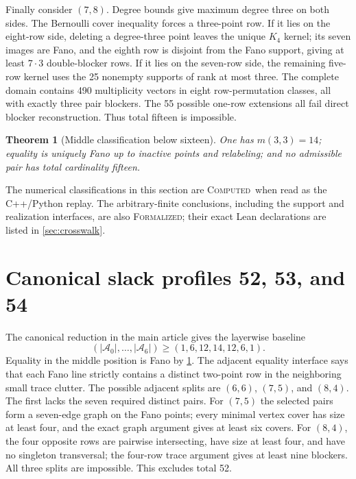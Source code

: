 \documentclass[11pt,a4paper]{article}
\newtheorem{theorem}{Theorem}[section]
\theoremstyle{definition}
\newcommand{\computed}{\textsc{Computed}}
\newcommand{\formalized}{\textsc{Formalized}}
\begin{document}
Finally consider $(7,8)$.  Degree bounds give maximum degree three on both
sides.  The Bernoulli cover inequality forces a three-point row.  If it lies
on the eight-row side, deleting a degree-three point leaves the unique
$K_4$ kernel; its seven images are Fano, and the eighth row is disjoint from
the Fano support, giving at least $7\cdot3$ double-blocker rows.  If it lies
on the seven-row side, the remaining five-row kernel uses the 25 nonempty
supports of rank at most three.  The complete domain contains 490
multiplicity vectors in eight row-permutation classes, all with exactly
three pair blockers.  The 55 possible one-row extensions all fail direct
blocker reconstruction.  Thus total fifteen is impossible.

\begin{theorem}[Middle classification below sixteen]
\label{thm:m33-classification}
One has $m(3,3)=14$; equality is uniquely Fano up to inactive points and
relabeling; and no admissible pair has total cardinality fifteen.
\end{theorem}

The numerical classifications in this section are \computed\ when read as
the C++/Python replay.  The arbitrary-finite conclusions, including the
support and realization interfaces, are also \formalized; their exact Lean
declarations are listed in \cref{sec:crosswalk}.

\section{Canonical slack profiles 52, 53, and 54}
\label{sec:profiles}

The canonical reduction in the main article gives the layerwise baseline
\[
 (|\mathcal A_0|,\ldots,|\mathcal A_6|)
 \geq(1,6,12,14,12,6,1).                \tag{S4.1}
\]
Equality in the middle position is Fano by
\cref{thm:m33-classification}.  The adjacent equality interface says that
each Fano line strictly contains a distinct two-point row in the neighboring
small trace clutter.  The possible adjacent splits are $(6,6)$, $(7,5)$,
and $(8,4)$.  The first lacks the seven required distinct pairs.  For
$(7,5)$ the selected pairs form a seven-edge graph on the Fano points; every
minimal vertex cover has size at least four, and the exact graph argument
gives at least six covers.  For $(8,4)$, the four opposite rows are
pairwise intersecting, have size at least four, and have no singleton
transversal; the four-row trace argument gives at least nine blockers.  All
three splits are impossible.  This excludes total 52.
\end{document}

